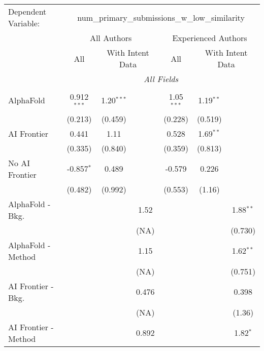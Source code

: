 \begingroup
\centering
\begin{tabular}{lcccccc}
   \tabularnewline \midrule \midrule
   Dependent Variable: & \multicolumn{6}{c}{num\_primary\_submissions\_w\_low\_similarity}\\
 & \multicolumn{3}{c}{All Authors} & \multicolumn{3}{c}{Experienced Authors} \\
\cmidrule(lr){2-4} \cmidrule(lr){5-7}
 & \multicolumn{1}{c}{All} & \multicolumn{2}{c}{With Intent Data} & \multicolumn{1}{c}{All} & \multicolumn{2}{c}{With Intent Data} \\
\cmidrule(lr){2-2} \cmidrule(lr){3-4} \cmidrule(lr){5-5} \cmidrule(lr){6-7}
 & \multicolumn{6}{c}{\textit{All Fields}} \\ \\
   AlphaFold               & 0.912$^{***}$ & 1.20$^{***}$ &       & 1.05$^{***}$ & 1.19$^{**}$ &   \\   
                           & (0.213)       & (0.459)      &       & (0.228)      & (0.519)     &   \\   
   AI Frontier             & 0.441         & 1.11         &       & 0.528        & 1.69$^{**}$ &   \\   
                           & (0.335)       & (0.840)      &       & (0.359)      & (0.813)     &   \\   
   No AI Frontier          & -0.857$^{*}$  & 0.489        &       & -0.579       & 0.226       &   \\   
                           & (0.482)       & (0.992)      &       & (0.553)      & (1.16)      &   \\   
   AlphaFold - Bkg.        &               &              & 1.52  &              &             & 1.88$^{**}$\\   
                           &               &              & (NA)  &              &             & (0.730)\\   
   AlphaFold - Method      &               &              & 1.15  &              &             & 1.62$^{**}$\\   
                           &               &              & (NA)  &              &             & (0.751)\\   
   AI Frontier - Bkg.      &               &              & 0.476 &              &             & 0.398\\   
                           &               &              & (NA)  &              &             & (1.36)\\   
   AI Frontier - Method    &               &              & 0.892 &              &             & 1.82$^{*}$\\   

\end{tabular}
